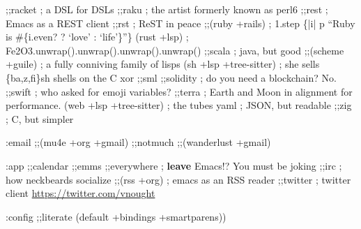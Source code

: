 \documentclass[11pt]{article}
\begin{document}
;;racket            ; a DSL for DSLs
;;raku              ; the artist formerly known as perl6
;;rest              ; Emacs as a REST client
;;rst               ; ReST in peace
;;(ruby +rails)     ; 1.step \{|i| p ``Ruby is \#\{i.even? ? `love' : `life'\}''\}
(rust +lsp)       ; Fe2O3.unwrap().unwrap().unwrap().unwrap()
;;scala             ; java, but good
;;(scheme +guile)   ; a fully conniving family of lisps
(sh +lsp +tree-sitter)                ; she sells \{ba,z,fi\}sh shells on the C xor
;;sml
;;solidity          ; do you need a blockchain? No.
;;swift             ; who asked for emoji variables?
;;terra             ; Earth and Moon in alignment for performance.
(web +lsp +tree-sitter)               ; the tubes
yaml              ; JSON, but readable
;;zig               ; C, but simpler

:email
;;(mu4e +org +gmail)
;;notmuch
;;(wanderlust +gmail)

:app
;;calendar
;;emms
;;everywhere        ; \textbf{leave} Emacs!? You must be joking
;;irc               ; how neckbeards socialize
;;(rss +org)        ; emacs as an RSS reader
;;twitter           ; twitter client \url{https://twitter.com/vnought}

:config
;;literate
(default +bindings +smartparens))
\end{document}
